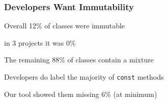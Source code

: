 \documentclass[aspectratio=169]{beamer}
\begin{document}
  \begin{frame}
    \frametitle{Developers Want Immutability}

    Overall 12\% of classes were immutable

    \hspace{1em} in 3 projects it was 0\%

    \vspace{1em}

    The remaining 88\% of classes contain a mixture

    \vspace{1em}


    \vspace{4em}

    Developers do label the majority of \texttt{const} methods

    \hspace{1em} Our tool showed them missing 6\% (at minimum)

    \vspace{1em}

  \end{frame}
\end{document}
